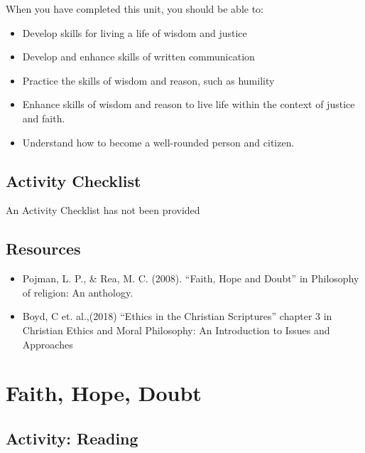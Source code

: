 \documentclass[
]{book}
\providecommand{\tightlist}{%
  \setlength{\itemsep}{0pt}\setlength{\parskip}{0pt}}
\begin{document}
When you have completed this unit, you should be able to:

\begin{itemize}
\tightlist
\item
  Develop skills for living a life of wisdom and justice\\
\item
  Develop and enhance skills of written communication\\
\item
  Practice the skills of wisdom and reason, such as humility\\
\item
  Enhance skills of wisdom and reason to live life within the context of justice and faith.\\
\item
  Understand how to become a well-rounded person and citizen.
\end{itemize}

\hypertarget{activity-checklist-2}{%
\subsection*{Activity Checklist}\label{activity-checklist-2}}

{An Activity Checklist has not been provided}

\hypertarget{resources-2}{%
\subsection*{Resources}\label{resources-2}}

\begin{itemize}
\tightlist
\item
  Pojman, L. P., \& Rea, M. C. (2008). ``Faith, Hope and Doubt'' in Philosophy of religion: An anthology.\\
\item
  Boyd, C et. al.,(2018) ``Ethics in the Christian Scriptures'' chapter 3 in Christian Ethics and Moral Philosophy: An Introduction to Issues and Approaches
\end{itemize}

\hypertarget{faith-hope-doubt}{%
\section{Faith, Hope, Doubt}\label{faith-hope-doubt}}

\hypertarget{activity-reading-5}{%
\subsection*{Activity: Reading}\label{activity-reading-5}}
\end{document}
